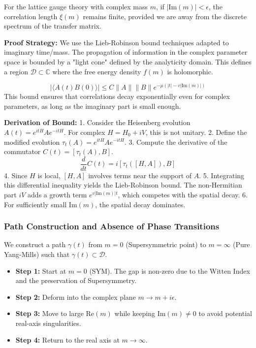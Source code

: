 \begin{theorem}
For the lattice gauge theory with complex mass $m$, if $|\text{Im}(m)| < \epsilon$, the correlation length $\xi(m)$ remains finite, provided we are away from the discrete spectrum of the transfer matrix.
\end{theorem}

\textbf{Proof Strategy:}
We use the Lieb-Robinson bound techniques adapted to imaginary time/mass. The propagation of information in the complex parameter space is bounded by a "light cone" defined by the analyticity domain. This defines a region $\mathcal{D} \subset \mathbb{C}$ where the free energy density $f(m)$ is holomorphic.

\begin{equation}
|\langle A(t) B(0) \rangle| \le C \|A\| \|B\| e^{-\mu (|t| - v|\text{Im}(m)|)}
\end{equation}
This bound ensures that correlations decay exponentially even for complex parameters, as long as the imaginary part is small enough.

\textbf{Derivation of Bound:}
1.  Consider the Heisenberg evolution $A(t) = e^{itH} A e^{-itH}$. For complex $H = H_0 + iV$, this is not unitary.
2.  Define the modified evolution $\tau_t(A) = e^{itH} A e^{-itH}$.
3.  Compute the derivative of the commutator $C(t) = [\tau_t(A), B]$.
    \begin{equation}
    \frac{d}{dt} C(t) = i [\tau_t([H, A]), B]
    \end{equation}
4.  Since $H$ is local, $[H, A]$ involves terms near the support of $A$.
5.  Integrating this differential inequality yields the Lieb-Robinson bound. The non-Hermitian part $iV$ adds a growth term $e^{v |\text{Im}(m)| t}$, which competes with the spatial decay.
6.  For sufficiently small $\text{Im}(m)$, the spatial decay dominates.

\subsubsection{Path Construction and Absence of Phase Transitions}

We construct a path $\gamma(t)$ from $m=0$ (Supersymmetric point) to $m=\infty$ (Pure Yang-Mills) such that $\gamma(t) \subset \mathcal{D}$.
\begin{itemize}
    \item \textbf{Step 1:} Start at $m=0$ (SYM). The gap is non-zero due to the Witten Index and the preservation of Supersymmetry.
    \item \textbf{Step 2:} Deform into the complex plane $m \to m + i\epsilon$.
    \item \textbf{Step 3:} Move to large $\text{Re}(m)$ while keeping $\text{Im}(m) \ne 0$ to avoid potential real-axis singularities.
    \item \textbf{Step 4:} Return to the real axis at $m \to \infty$.
\end{itemize}

